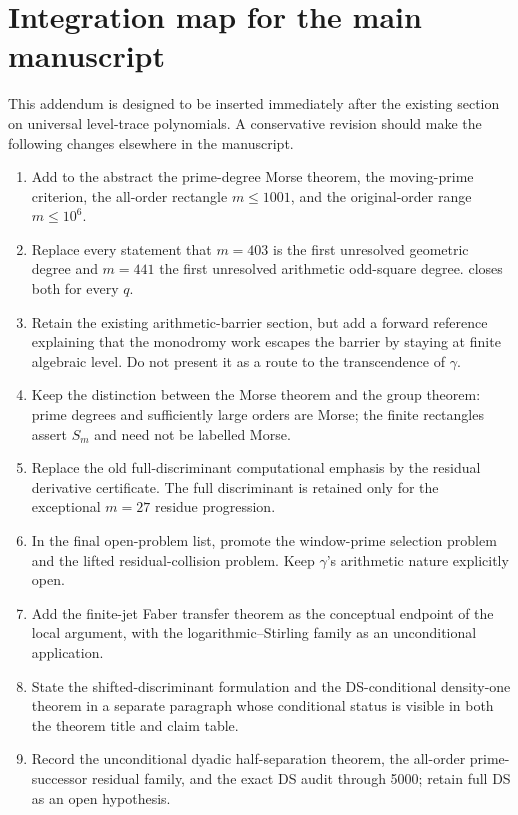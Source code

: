 \documentclass[11pt]{article}
\theoremstyle{keio}
\theoremstyle{keioinput}
\begin{document}
\section{Integration map for the main manuscript}

This addendum is designed to be inserted immediately after the existing
section on universal level-trace polynomials. A conservative revision should
make the following changes elsewhere in the manuscript.
\begin{enumerate}\sloppy
\item Add to the abstract the prime-degree Morse theorem, the moving-prime
criterion, the all-order rectangle $m\le1001$, and the original-order range
$m\le10^6$.
\item Replace every statement that $m=403$ is the first unresolved geometric
degree and $m=441$ the first unresolved arithmetic odd-square degree.
 closes both for every $q$.
\item Retain the existing arithmetic-barrier section, but add a forward
reference explaining that the monodromy work escapes the barrier by staying
at finite algebraic level. Do not present it as a route to the transcendence
of $\gamma$.
\item Keep the distinction between the Morse theorem and the group theorem:
prime degrees and sufficiently large orders are Morse; the finite rectangles
assert $S_m$ and need not be labelled Morse.
\item Replace the old full-discriminant computational emphasis by the
residual derivative certificate. The full discriminant is retained only for
the exceptional $m=27$ residue progression.
\item In the final open-problem list, promote the window-prime selection
problem and the lifted residual-collision problem. Keep $\gamma$'s arithmetic
nature explicitly open.
\item Add the finite-jet Faber transfer theorem as the conceptual endpoint
of the local argument, with the logarithmic--Stirling family as an
unconditional application.
\item State the shifted-discriminant formulation and the DS-conditional
density-one theorem in a separate paragraph whose conditional status is
visible in both the theorem title and claim table.
\item {\raggedright Record the unconditional dyadic half-separation theorem,
the all-order prime-successor residual family, and the exact DS audit through
5000; retain full DS as an open hypothesis.\par}
\end{enumerate}
\end{document}
